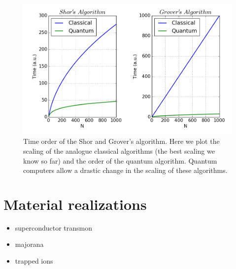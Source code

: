 \begin{figure}[!h]
  \centering
  \includegraphics{chapter01/figures/quantum_scaling.png}
  \vspace{-5pt}
  \caption{Time order of the Shor and Grover's algorithm. Here we plot the scaling of the analogue classical algorithms (the best scaling we know so far) and the order of the quantum algorithm. Quantum computers allow a drastic change in the scaling of these algorithms.}
\end{figure}
\FloatBarrier


\section{Material realizations}
\begin{itemize}
  \item superconductor transmon
  \item majorana
  \item trapped ions
\end{itemize}
